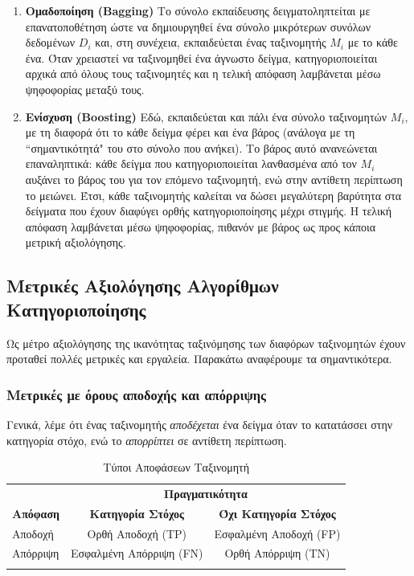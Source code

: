 \begin{enumerate}

\item \textbf{Ομαδοποίηση (Bagging)} Το σύνολο εκπαίδευσης δειγματοληπτείται με επανατοποθέτηση ώστε να δημιουργηθεί ένα σύνολο μικρότερων συνόλων δεδομένων $D_{i}$ και, στη συνέχεια, εκπαιδεύεται ένας ταξινομητής $M_{i}$ με το κάθε ένα. Όταν χρειαστεί να ταξινομηθεί ένα άγνωστο δείγμα, κατηγοριοποιείται αρχικά από όλους τους ταξινομητές και η τελική απόφαση λαμβάνεται μέσω ψηφοφορίας μεταξύ τους.

\item \textbf{Ενίσχυση (Boosting)} Εδώ, εκπαιδεύεται και πάλι ένα σύνολο ταξινομητών $M_{i}$, με τη διαφορά ότι το κάθε δείγμα φέρει και ένα βάρος (ανάλογα με τη “σημαντικότητά" του στο σύνολο που ανήκει). Το βάρος αυτό ανανεώνεται επαναληπτικά: κάθε δείγμα που κατηγοριοποιείται λανθασμένα από τον $M_{i}$ αυξάνει το βάρος του για τον επόμενο ταξινομητή, ενώ στην αντίθετη περίπτωση το μειώνει. Έτσι, κάθε ταξινομητής καλείται να δώσει μεγαλύτερη βαρύτητα στα δείγματα που έχουν διαφύγει ορθής κατηγοριοποίησης μέχρι στιγμής. Η τελική απόφαση λαμβάνεται μέσω ψηφοφορίας, πιθανόν με βάρος ως προς κάποια μετρική αξιολόγησης.
\end{enumerate}

\subsection{Μετρικές Αξιολόγησης Αλγορίθμων Κατηγοριοποίησης}
Ως μέτρο αξιολόγησης της ικανότητας ταξινόμησης των διαφόρων ταξινομητών έχουν προταθεί πολλές μετρικές και εργαλεία. Παρακάτω αναφέρουμε τα σημαντικότερα.

\subsubsection{Μετρικές με όρους αποδοχής και απόρριψης}
\label{subsub:metrics}
Γενικά, λέμε ότι ένας ταξινομητής \emph{αποδέχεται} ένα δείγμα όταν το κατατάσσει στην κατηγορία στόχο, ενώ το \emph{απορρίπτει} σε αντίθετη περίπτωση.
\\ 

\begin{table}[htbp]
\caption{Τύποι Αποφάσεων Ταξινομητή}
\begin{center}
\begin{tabular}{ p{1.9cm} | c | c | }
\cline{2-3} 
& \multicolumn{2}{c|}{\textbf{Πραγματικότητα}} \\ \cline{2-3}
\textbf{Απόφαση} & \textbf{Κατηγορία Στόχος} & \textbf{Όχι Κατηγορία Στόχος} \\  
\hline
Αποδοχή & Ορθή Αποδοχή (TP) & Εσφαλμένη Αποδοχή (FP) \\
\hline  
Απόρριψη & Εσφαλμένη Απόρριψη (FN) & Ορθή Απόρριψη (TN) \\  
\lasthline
\end{tabular}
\end{center}

\label{errorTypes}
\end{table}


